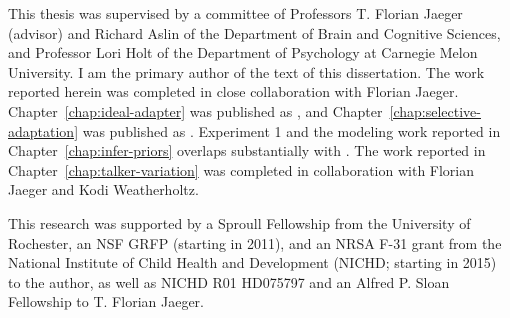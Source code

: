 \begin{contributorsandfunding}
  This thesis was supervised by a committee of Professors T. Florian Jaeger
  (advisor) and Richard Aslin of the Department of Brain and Cognitive Sciences,
  and Professor Lori Holt of the Department of Psychology at Carnegie Melon
  University. I am the primary author of the text of this dissertation. The work
  reported herein was completed in close collaboration with Florian
  Jaeger. Chapter~\ref{chap:ideal-adapter} was published as
  \textcite{Kleinschmidt2015}, and Chapter~\ref{chap:selective-adaptation} was
  published as \textcite{Kleinschmidt2015b}. Experiment 1 and the modeling work
  reported in Chapter~\ref{chap:infer-priors} overlaps substantially with
  \textcite{Kleinschmidt2016}. The work reported in
  Chapter~\ref{chap:talker-variation} was completed in collaboration with
  Florian Jaeger and Kodi Weatherholtz.

  This research was supported by a Sproull Fellowship from the University of
  Rochester, an NSF GRFP (starting in 2011), and an NRSA F-31 grant from the
  National Institute of Child Health and Development (NICHD; starting in 2015)
  to the author, as well as NICHD R01 HD075797 and an Alfred P. Sloan Fellowship
  to T. Florian Jaeger.
\end{contributorsandfunding}